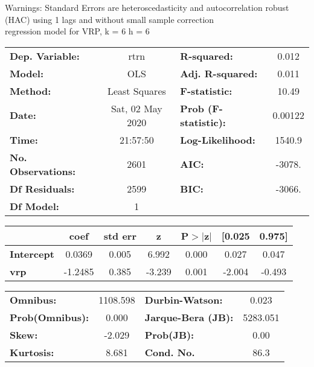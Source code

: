 Warnings: \newline
 [1] Standard Errors are heteroscedasticity and autocorrelation robust (HAC) using 1 lags and without small sample correction\\ 

regression model for VRP, k = 6 h = 6\begin{center}
\begin{tabular}{lclc}
\toprule
\textbf{Dep. Variable:}    &       rtrn       & \textbf{  R-squared:         } &     0.012   \\
\textbf{Model:}            &       OLS        & \textbf{  Adj. R-squared:    } &     0.011   \\
\textbf{Method:}           &  Least Squares   & \textbf{  F-statistic:       } &     10.49   \\
\textbf{Date:}             & Sat, 02 May 2020 & \textbf{  Prob (F-statistic):} &  0.00122    \\
\textbf{Time:}             &     21:57:50     & \textbf{  Log-Likelihood:    } &    1540.9   \\
\textbf{No. Observations:} &        2601      & \textbf{  AIC:               } &    -3078.   \\
\textbf{Df Residuals:}     &        2599      & \textbf{  BIC:               } &    -3066.   \\
\textbf{Df Model:}         &           1      & \textbf{                     } &             \\
\bottomrule
\end{tabular}
\begin{tabular}{lcccccc}
                   & \textbf{coef} & \textbf{std err} & \textbf{z} & \textbf{P$> |$z$|$} & \textbf{[0.025} & \textbf{0.975]}  \\
\midrule
\textbf{Intercept} &       0.0369  &        0.005     &     6.992  &         0.000        &        0.027    &        0.047     \\
\textbf{vrp}       &      -1.2485  &        0.385     &    -3.239  &         0.001        &       -2.004    &       -0.493     \\
\bottomrule
\end{tabular}
\begin{tabular}{lclc}
\textbf{Omnibus:}       & 1108.598 & \textbf{  Durbin-Watson:     } &    0.023  \\
\textbf{Prob(Omnibus):} &   0.000  & \textbf{  Jarque-Bera (JB):  } & 5283.051  \\
\textbf{Skew:}          &  -2.029  & \textbf{  Prob(JB):          } &     0.00  \\
\textbf{Kurtosis:}      &   8.681  & \textbf{  Cond. No.          } &     86.3  \\
\bottomrule
\end{tabular}
\end{center}

